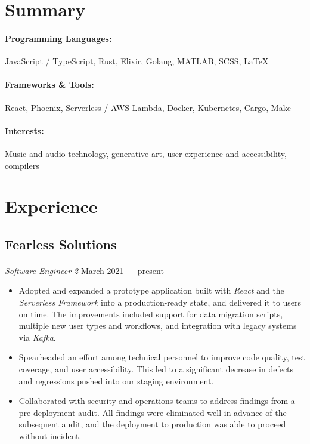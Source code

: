\documentclass[10pt]{article}
\begin{document}

\section*{Summary}
\paragraph{Programming Languages:} JavaScript / TypeScript, Rust, Elixir,
Golang, MATLAB, SCSS, \LaTeX\@

\paragraph{Frameworks \& Tools:} React, Phoenix, Serverless / AWS Lambda,
Docker, Kubernetes, Cargo, Make

\paragraph{Interests:} Music and audio technology, generative art, user
experience and accessibility, compilers

\dotfill

\section*{Experience}
\subsection*{Fearless Solutions}
\paragraph{}
\textit{Software Engineer 2} \hfill March 2021 --- present
\begin{itemize}
  \item Adopted and expanded a prototype application built with \textit{React}
    and the \textit{Serverless Framework} into a production-ready state, and
    delivered it to users on time. The improvements included support for data
    migration scripts, multiple new user types and workflows, and integration
    with legacy systems via \textit{Kafka}.
  \item Spearheaded an effort among technical personnel to improve code
    quality, test coverage, and user accessibility. This led to a significant
    decrease in defects and regressions pushed into our staging environment.
  \item Collaborated with security and operations teams to address findings
    from a pre-deployment audit. All findings were eliminated well in advance
    of the subsequent audit, and the deployment to production was able to
    proceed without incident.
\end{itemize}
\end{document}
